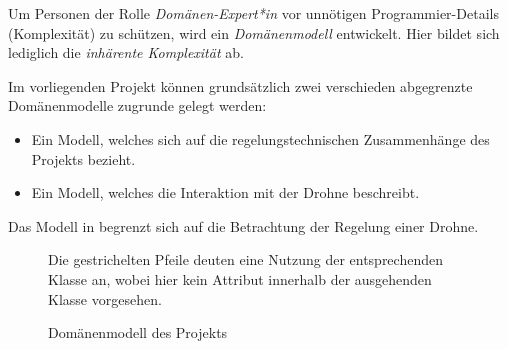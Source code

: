 
Um Personen der  Rolle \textit{Domänen-Expert*in} vor unnötigen Programmier-Details (Komplexität) zu schützen, wird ein \textit{Domänenmodell} entwickelt. Hier bildet sich lediglich die \textit{inhärente Komplexität} ab.

Im vorliegenden Projekt können grundsätzlich zwei verschieden abgegrenzte Domänenmodelle zugrunde gelegt werden:
\begin{itemize}
\item Ein Modell, welches sich auf die regelungstechnischen Zusammenhänge des Projekts bezieht.
\item Ein Modell, welches die Interaktion mit der Drohne beschreibt.
\end{itemize}

Das Modell in  begrenzt sich auf die Betrachtung der Regelung einer Drohne. 

\begin{figure}[ht!]
\vspace{0.25cm}
\begin{center}
\caption{Domänenmodell des Projekts}
\label{fig:DomainMod}
\end{center}

\vspace{0.25cm}
Die gestrichelten Pfeile deuten eine Nutzung der entsprechenden Klasse an, wobei hier kein Attribut innerhalb der ausgehenden Klasse vorgesehen.
\end{figure}






